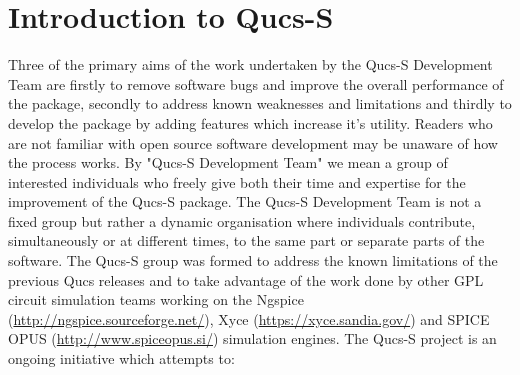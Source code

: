 \section{Introduction to Qucs-S}
Three of the primary aims of the work undertaken by the Qucs-S Development Team are firstly to remove software bugs and improve the overall performance of the package, secondly to address known weaknesses and limitations and thirdly to develop the package by adding features which increase it's utility.  Readers who are not familiar with open source software development may be unaware of how the process works.  By "Qucs-S Development Team" we mean a group of interested individuals who freely give both their time and expertise for the improvement of the Qucs-S package.  The Qucs-S Development Team is not a fixed group but rather a dynamic organisation where individuals contribute, simultaneously or at different times, to the same part or separate parts of the software.  The Qucs-S group was formed to address the known limitations of the previous Qucs releases and to take advantage of the work done by other GPL circuit simulation teams working on the Ngspice (\url{http://ngspice.sourceforge.net/}), Xyce (\url{https://xyce.sandia.gov/}) and SPICE OPUS (\url{http://www.spiceopus.si/}) simulation engines. The Qucs-S project is an ongoing initiative which attempts to:
